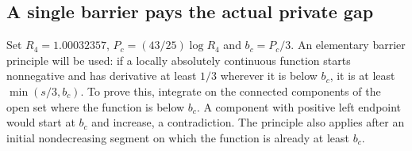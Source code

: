 \subsection{A single barrier pays the actual private gap}

Set $R_4=1.00032357$, $P_c=(43/25)\log R_4$ and $b_c=P_c/3$.
An elementary barrier principle will be used: if a locally absolutely
continuous function starts nonnegative and has derivative at least $1/3$
wherever it is below $b_c$, it is at least $\min(s/3,b_c)$.
To prove this, integrate on the connected components of the open set
where the function is below $b_c$.  A component with positive left endpoint
would start at $b_c$ and increase, a contradiction.
The principle also applies after an initial nondecreasing segment on
which the function is already at least $b_c$.

